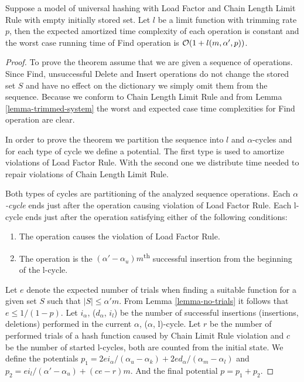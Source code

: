 \begin{theorem}
\label{theorem-amortised-expected-time}
Suppose a model of universal hashing with Load Factor and Chain Length Limit Rule with empty initially stored set. Let $l$ be a limit function with trimming rate $p$, then the expected amortized time complexity of each operation is constant and the worst case running time of Find operation is $\mathcal{O}(1 + l(m, \alpha', p))$.
\end{theorem}
\begin{proof}
To prove the theorem assume that we are given a sequence of operations. Since Find, unsuccessful Delete and Insert operations do not change the stored set $S$ and have no effect on the dictionary we simply omit them from the sequence. Because we conform to Chain Length Limit Rule and from Lemma \ref{lemma-trimmed-system} the worst and expected case time complexities for Find operation are clear.

In order to prove the theorem we partition the sequence into $l$ and $\alpha$-cycles and for each type of cycle we define a potential. The first type is used to amortize violations of Load Factor Rule. With the second one we distribute time needed to repair violations of Chain Length Limit Rule.

\begin{definition}
Both types of cycles are partitioning of the analyzed sequence operations.
Each \emph{$\alpha$-cycle} ends just after the operation causing violation of Load Factor Rule.
Each l-cycle ends just after the operation satisfying either of the following conditions:
\begin{enumerate}
\item The operation causes the violation of Load Factor Rule.
\item The operation is the $(\alpha' - \alpha_u) m$\textsuperscript{th} successful insertion from the beginning of the l-cycle.
\end{enumerate}
\end{definition}

Let $e$ denote the expected number of trials when finding a suitable function for a given set $S$ such that $|S| \leq \alpha'm$. From Lemma \ref{lemma-no-trials} it follows that $e \leq 1 / (1 - p)$. Let $i_{\alpha}$, ($d_\alpha$, $i_l$) be the number of successful insertions (insertions, deletions) performed in the current $\alpha$, ($\alpha$, l)-cycle. Let $r$ be the number of performed trials of a hash function caused by Chain Limit Rule violation and $c$ be the number of started l-cycles, both are counted from the initial state. We define the potentials $p_1 = {2ei_{\alpha}}/{(\alpha_u - \alpha_k)} + {2ed_{\alpha}}/{(\alpha_m - \alpha_l)}$ and $p_2 = {ei_{l}}/{(\alpha' - \alpha_u)} + (ce - r) m$. And the final potential $p = p_1 + p_2$.


\end{proof}

